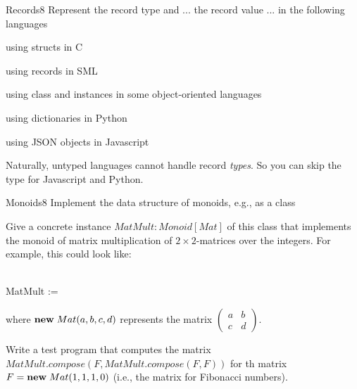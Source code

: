 \documentclass[a4paper]{article}
\begin{document}
\header

\begin{problem}{Records}{8}
Represent the record type and ... the record value ... in the following languages
\begin{compactitem}
 \item using structs in C
 \item using records in SML
 \item using class and instances in some object-oriented languages
 \item using dictionaries in Python
 \item using JSON objects in Javascript
\end{compactitem}

Naturally, untyped languages cannot handle record \emph{types}. So you can skip the type for Javascript and Python.
\end{problem}

\begin{problem}{Monoids}{8}
Implement the data structure of monoids, e.g., as a class

\begin{acode}
\end{acode}

Give a concrete instance $MatMult:Monoid[Mat]$ of this class that implements the monoid of matrix multiplication of $2\times 2$-matrices over the integers.
For example, this could look like:
\begin{acode}
\\
MatMult := \anewA{Monoid[Mat]}{}{\ablock{
 \afun[Mat]{compose}{x:Mat,y:Mat}{\ldots}\\
 \afun[Mat]{neutral]}{}{\anew{Mat}{1,0,0,1}}
}\\
}
\end{acode}
where ${\rm \bf new}\; Mat(a,b,c,d)$ represents the matrix $\begin{pmatrix}a & b \\ c & d\end{pmatrix}$.

Write a test program that computes the matrix $MatMult.compose(F,MatMult.compose(F,F))$ for th matrix $F={\rm \bf new}\; Mat(1,1,1,0)$ (i.e., the matrix for Fibonacci numbers).
\end{problem}
\end{document}
